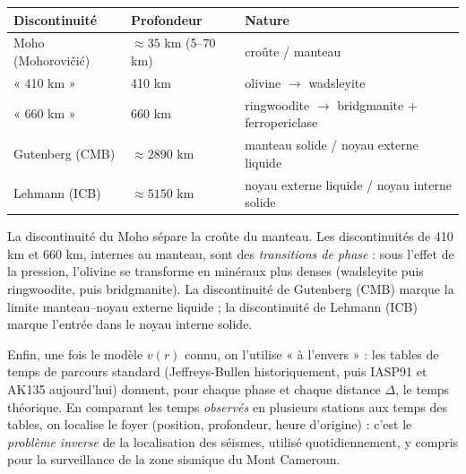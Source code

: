 \documentclass[11pt]{article}
\newcommand{\cle}[1]{{\popxbold\color{popdark}#1}}
\begin{document}
\begin{center}
\begin{tabularx}{\linewidth}{|l|X|X|}\hline
\rowcolor{popblueL}
\textbf{Discontinuité} & \textbf{Profondeur} & \textbf{Nature} \\ \hline
Moho (Mohorovičić) & $\approx 35$ km (5--70 km) & croûte / manteau \\ \hline
« 410 km » & 410 km & olivine $\rightarrow$ wadsleyite \\ \hline
« 660 km » & 660 km & ringwoodite $\rightarrow$ bridgmanite + ferropericlase \\ \hline
Gutenberg (CMB) & $\approx \num{2890}$ km & manteau solide / noyau externe liquide \\ \hline
Lehmann (ICB) & $\approx \num{5150}$ km & noyau externe liquide / noyau interne solide \\ \hline
\end{tabularx}
\end{center}

\begin{definition}
La \cle{discontinuité du Moho} sépare la croûte du manteau. Les discontinuités de \cle{410 km} et \cle{660 km}, internes au manteau, sont des \emph{transitions de phase} : sous l'effet de la pression, l'olivine se transforme en minéraux plus denses (wadsleyite puis ringwoodite, puis bridgmanite). La \cle{discontinuité de Gutenberg} (CMB) marque la limite manteau--noyau externe liquide ; la \cle{discontinuité de Lehmann} (ICB) marque l'entrée dans le noyau interne solide.
\end{definition}

Enfin, une fois le modèle $v(r)$ connu, on l'utilise « à l'envers » : les \cle{tables de temps de parcours} standard (Jeffreys-Bullen historiquement, puis \cle{IASP91} et \cle{AK135} aujourd'hui) donnent, pour chaque phase et chaque distance $\Delta$, le temps théorique. En comparant les temps \emph{observés} en plusieurs stations aux temps des tables, on localise le foyer (position, profondeur, heure d'origine) : c'est le \emph{problème inverse} de la localisation des séismes, utilisé quotidiennement, y compris pour la surveillance de la zone sismique du Mont Cameroun.
\end{document}
